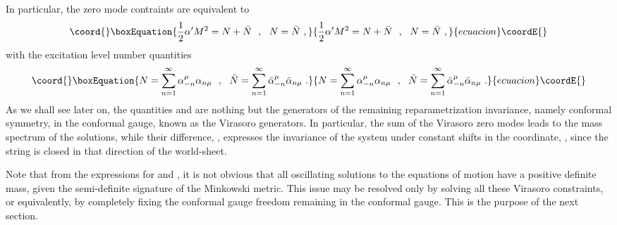 \documentclass[a4paper,11pt]{article}
\begin{document}
In particular, the zero mode contraints \coordHE{} are equivalent to
\begin{equation}\coord{}\boxEquation{
\frac{1}{2}\alpha' M^2=N+\bar{N}\ \ ,\ \ N=\bar{N}\ ,
}{
\frac{1}{2}\alpha' M^2=N+\bar{N}\ \ ,\ \ N=\bar{N}\ ,
}{ecuacion}\coordE{}\end{equation}
with the excitation level number quantities
\begin{equation}\coord{}\boxEquation{
N=\sum_{n=1}^\infty \alpha^\mu_{-n}\alpha_{n\mu}\ \ ,\ \ 
\bar{N}=\sum_{n=1}^\infty\bar{\alpha}^\mu_{-n}\bar{\alpha}_{n\mu}\ .
}{
N=\sum_{n=1}^\infty \alpha^\mu_{-n}\alpha_{n\mu}\ \ ,\ \ 
\bar{N}=\sum_{n=1}^\infty\bar{\alpha}^\mu_{-n}\bar{\alpha}_{n\mu}\ .
}{ecuacion}\coordE{}\end{equation}
As we shall see later on, the quantities \myHighlight{$L_n$}\coordHE{} and \coordHE{} are nothing 
but the generators of the remaining reparametrization invariance, namely 
conformal symmetry, in the conformal gauge, known as the Virasoro generators. 
In particular, the sum of the Virasoro zero modes \coordHE{} leads 
to the mass spectrum of the solutions, while their difference, 
\myHighlight{$L_0-\bar{L}_0=0$}\coordHE{}, expresses the invariance of the system under constant 
shifts in the \myHighlight{$\sigma$}\coordHE{} coordinate, \coordHE{}, since 
the string is closed in that direction of the world-sheet.

Note that from the expressions for \coordHE{} and \coordHE{}, it is not obvious
that all oscillating solutions to the equations of motion have a positive 
definite mass, given the semi-definite signature of the Minkowski metric.
This issue may be resolved only by solving all these Virasoro constraints,
or equivalently, by completely fixing the conformal gauge freedom remaining
in the conformal gauge. This is the purpose of the next section.
\end{document}
